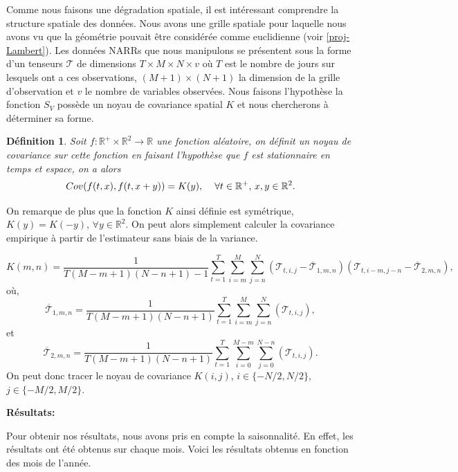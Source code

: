 \documentclass[a4paper,11pt]{article}
\newtheorem{definition}{Définition}
\begin{document}
Comme nous faisons une dégradation spatiale, il est intéressant comprendre la structure spatiale des données. Nous avons une grille spatiale pour laquelle nous avons vu que la géométrie pouvait être considérée comme euclidienne (voir \ref{proj-Lambert}). Les données NARRs que nous manipulons se présentent sous la forme d'un tenseurs $\mathcal{T}$ de dimensions $T \times M\times N\times v$ où $T$ est le nombre de jours sur lesquels ont a ces observations, $(M+1)\times (N+1)$ la dimension de la grille d'observation et $v$ le nombre de variables observées. Nous faisons l'hypothèse la fonction $S_{V}$ possède un noyau de covariance spatial $K$ et nous chercherons à déterminer sa forme. 

\begin{definition}
	Soit $f:\mathbb{R}^{+}\times\mathbb{R}^2\to \mathbb{R}$ une fonction aléatoire, on définit un noyau de covariance sur cette fonction en faisant l'hypothèse que $f$ est stationnaire en temps et espace, on a alors
	\[Cov(f(t,x),f(t,x+y))=K(y), \hspace{4mm} \forall t \in \mathbb{R}^{+},\,x,y \in \mathbb{R}^2. \] 
\end{definition}
On remarque de plus que la fonction $K$ ainsi définie est symétrique, $K(y)=K(-y),\, \forall y \in \mathbb{R}^2$. On peut alors simplement calculer la covariance empirique à partir de l'estimateur sans biais de la variance.

\[K(m,n)=\frac{1}{T(M-m+1)(N-n+1)-1}\sum_{t=1}^{T}\sum_{i=m}^{M}\sum_{j=n}^{N}(\mathcal{T}_{t,i,j}-\overline{\mathcal{T}}_{1,m,n})(\mathcal{T}_{t,i-m,j-n}-\overline{\mathcal{T}}_{2,m,n}),\]
où,
\[\overline{\mathcal{T}}_{1,m,n}=\frac{1}{T(M-m+1)(N-n+1)}\sum_{t=1}^{T}\sum_{i=m}^{M}\sum_{j=n}^{N}(\mathcal{T}_{t,i,j}),\]
et 
\[\overline{\mathcal{T}}_{2,m,n}=\frac{1}{T(M-m+1)(N-n+1)}\sum_{t=1}^{T}\sum_{i=0}^{M-m}\sum_{j=0}^{N-n}(\mathcal{T}_{t,i,j}).\]
On peut donc tracer le noyau de covariance $K(i,j)$, $i \in\{-N/2,N/2\}$, $j \in \{-M/2,M/2\}$. 

\noindent \textbf{Résultats:}

Pour obtenir nos résultats, nous avons pris en compte la saisonnalité. En effet, les résultats ont été obtenus sur chaque mois. Voici les résultats obtenus en fonction des mois de l'année.
\end{document}
